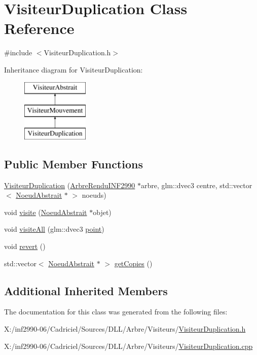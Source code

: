 \hypertarget{class_visiteur_duplication}{\section{Visiteur\-Duplication Class Reference}
\label{class_visiteur_duplication}
}


{\ttfamily \#include $<$Visiteur\-Duplication.\-h$>$}

Inheritance diagram for Visiteur\-Duplication\-:\begin{figure}[H]
\begin{center}
\leavevmode
\includegraphics[height=3.000000cm]{class_visiteur_duplication}
\end{center}
\end{figure}
\subsection*{Public Member Functions}
\begin{DoxyCompactItemize}
\item 
\hyperlink{group__inf2990_ga8414468ed98104dc0021bac950ae024e}{Visiteur\-Duplication} (\hyperlink{class_arbre_rendu_i_n_f2990}{Arbre\-Rendu\-I\-N\-F2990} $\ast$arbre, glm\-::dvec3 centre, std\-::vector$<$ \hyperlink{class_noeud_abstrait}{Noeud\-Abstrait} $\ast$ $>$ noeuds)
\item 
void \hyperlink{group__inf2990_ga5fb08c9779e47f2242f17c3901a9e5f0}{visite} (\hyperlink{class_noeud_abstrait}{Noeud\-Abstrait} $\ast$objet)
\item 
void \hyperlink{group__inf2990_ga9a9e38fcb3587b612537f52c92911fa6}{visite\-All} (glm\-::dvec3 \hyperlink{group__inf2990_ga8a44174e0b3838fd7371a5056d3be30f}{point})
\item 
void \hyperlink{group__inf2990_ga3482b5c805172df88b04f233947997ed}{revert} ()
\item 
std\-::vector$<$ \hyperlink{class_noeud_abstrait}{Noeud\-Abstrait} $\ast$ $>$ \hyperlink{group__inf2990_ga90724e00899dbefc0709dc74bda25f9e}{get\-Copies} ()
\end{DoxyCompactItemize}
\subsection*{Additional Inherited Members}


The documentation for this class was generated from the following files\-:\begin{DoxyCompactItemize}
\item 
X\-:/inf2990-\/06/\-Cadriciel/\-Sources/\-D\-L\-L/\-Arbre/\-Visiteurs/\hyperlink{_visiteur_duplication_8h}{Visiteur\-Duplication.\-h}\item 
X\-:/inf2990-\/06/\-Cadriciel/\-Sources/\-D\-L\-L/\-Arbre/\-Visiteurs/\hyperlink{_visiteur_duplication_8cpp}{Visiteur\-Duplication.\-cpp}\end{DoxyCompactItemize}
